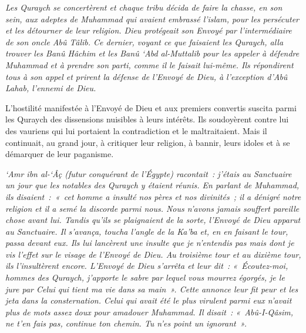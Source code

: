 \emph{Les Quraych se concertèrent et chaque tribu décida de faire la
chasse, en son sein, aux adeptes de Muhammad qui avaient embrassé
l'islam, pour les persécuter et les détourner de leur religion. Dieu
protégeait son Envoyé par l'intermédiaire de son oncle Abû Tâlib. Ce
dernier, voyant ce que faisaient les Quraych, alla trouver les Banû
Hâchim et les Banû `Abd al-Muttalib pour les appeler à défendre Muhammad
et à prendre son parti, comme il le faisait lui-même. Ils répondirent
tous à son appel et prirent la défense de l'Envoyé de
Dieu}\emph{, à l'exception d'Abû
Lahab}\emph{,
l'ennemi de Dieu.}


L'hostilité manifestée à l'Envoyé de Dieu et aux premiers convertis
suscita parmi les Quraych des dissensions nuisibles à leurs intérêts.
Ils soudoyèrent contre lui des vauriens qui lui portaient la
contradiction et le maltraitaient. Mais il continuait, au grand jour, à
critiquer leur religion, à bannir, leurs idoles et à se démarquer de
leur paganisme.

\emph{`Amr ibn al-`Âç (futur conquérant de l'Égypte) racontait~: j'étais
au Sanctuaire un jour que les notables des Quraych y étaient réunis. En
parlant de Muhammad, ils disaient~:~«~cet homme a insulté nos pères et
nos divinités~; il a dénigré notre religion et il a semé la discorde
parmi nous. Nous n'avons jamais souffert pareille chose avant lui.
Tandis qu'ils se plaignaient de la sorte, l'Envoyé de Dieu apparut au
Sanctuaire. Il s'avança, toucha l'angle de la Ka'ba et, en en faisant le
tour, passa devant eux. Ils lui lancèrent une insulte que je n'entendis
pas mais dont je vis l'effet sur le visage de l'Envoyé de Dieu. Au
troisième tour et au dixième tour, ils l'insultèrent encore. L'Envoyé de
Dieu s'arrêta et leur dit~: «~Écoutez-moi, hommes des Quraych, j'apporte
le sabre par lequel vous mourrez égorgés, je le jure par Celui qui tient
ma vie dans sa main~». Cette annonce leur fit peur et les jeta dans la
consternation. Celui qui avait été le plus virulent parmi eux n'avait
plus de mots assez doux pour amadouer Muhammad. Il disait~:
«~Abû-I-Qâsim, ne t'en fais pas, continue ton chemin. Tu n'es point un
ignorant~».}

